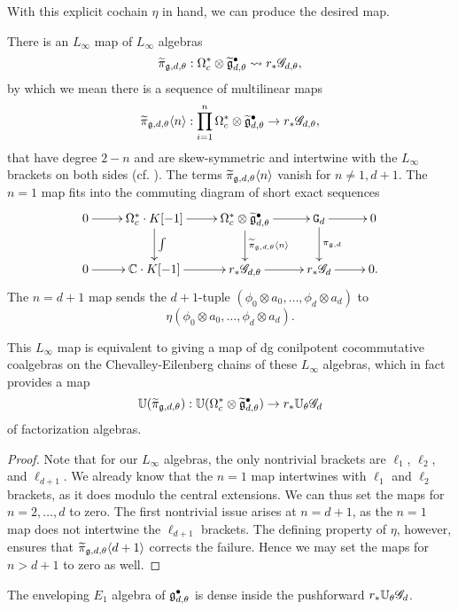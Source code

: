 With this explicit cochain $\eta$ in hand, we can produce the desired map.

\begin{prop}
There is an $L_\infty$ map of $L_\infty$ algebras
\[
\widetilde{\pi}_{\mathfrak g,d,\theta}: \Omega^*_c \otimes \widetilde{\mathfrak g}^\bullet_{d,\theta} \rightsquigarrow r_* \mathscr G_{d,\theta},
\]
by which we mean there is a sequence of multilinear maps
\[
\widetilde{\pi}_{\mathfrak g,d,\theta}\langle n\rangle: \prod_{i=1}^n \Omega^*_c \otimes \widetilde{\mathfrak g}^\bullet_{d,\theta} \to r_* \mathscr G_{d,\theta},
\]
that have degree $2-n$ and are skew-symmetric and intertwine with the $L_\infty$ brackets on both sides (cf. \cite{KonSoi, LodVal}).
The terms $\widetilde{\pi}_{\mathfrak g,d,\theta}\langle n\rangle$ vanish for $n \neq 1, d+1$.
The $n =1$ map fits into the commuting diagram of short exact sequences
\[
\xymatrix{
0 \ar[r] & \Omega^*_c \cdot K [-1]  \ar[d]^{\int} \ar[r] & \Omega^*_c \otimes \Tilde{\fg}^\bullet_{d,\theta} \ar[d]^{\Tilde{\pi}_{\fg,d,\theta}\<n\>} \ar[r] & \mathtt{G}_d \ar[d]^{\pi_{\fg, d}} \ar[r] & 0 \\
0 \ar[r] & \CC \cdot K [-1] \ar[r] & r_*\sG_{d,\theta} \ar[r] & r_* \sG_{d} \ar[r] & 0 .
}
\]
The $n=d+1$ map sends the $d+1$-tuple $(\phi_0 \otimes a_0, \ldots, \phi_d \otimes a_d)$ to
\[
\eta(\phi_0 \otimes a_0, \ldots, \phi_d \otimes a_d).
\]

This $L_\infty$ map is equivalent to giving a map of dg conilpotent cocommutative coalgebras on the Chevalley-Eilenberg chains of these $L_\infty$ algebras,
which in fact provides a map
\[
\mathbb U(\widetilde{\pi}_{\mathfrak g,d,\theta}): \mathbb U(\Omega^*_c \otimes \widetilde{\mathfrak g}^\bullet_{d,\theta}) \to r_* \mathbb U_\theta\mathscr G_d
\]
of factorization algebras.
\end{prop}

\begin{proof}
Note that for our $L_\infty$ algebras, the only nontrivial brackets are $\ell_1$, $\ell_2$, and $\ell_{d+1}$.
We already know that the $n=1$ map intertwines with $\ell_1$ and $\ell_2$ brackets,
as it does modulo the central extensions.
We can thus set the maps for $n=2,\ldots, d$ to zero. 
The first nontrivial issue arises at $n=d+1$, as the $n=1$ map does not intertwine the $\ell_{d+1}$ brackets.
The defining property of $\eta$, however, ensures that $\widetilde{\pi}_{\mathfrak g,d,\theta}\langle d+1\rangle$ corrects the failure.
Hence we may set the maps for $n > d+1$ to zero as well.
\end{proof}

\begin{cor}
The enveloping $E_1$ algebra of $\mathfrak g^\bullet_{d,\theta}$ is dense inside the pushforward $r_* \mathbb U_\theta\mathscr G_d$.
\end{cor}

